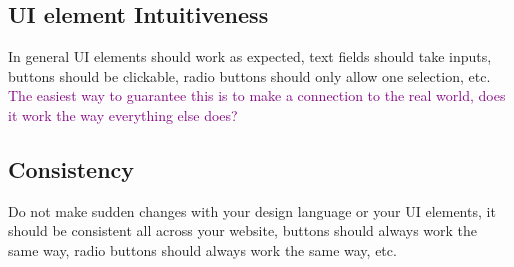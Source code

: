 \documentclass[main.tex,fontsize=6pt,paper=a4,paper=landscape,DIV=calc,]{scrartcl}
\begin{document}
\begin{multicols*}{4}
\subsection{UI element Intuitiveness}  
In general UI elements should work as expected, text fields should take inputs, buttons should be clickable, radio buttons should only allow one selection, etc.\newline
\textcolor{purple}{The easiest way to guarantee this is to make a connection to the real world, does it work the way everything else does?}

\subsection{Consistency}  
Do not make sudden changes with your design language or your UI elements, it should be consistent all across your website, buttons should always work the same way, radio buttons should always work the same way, etc.


\end{multicols*}
\end{document}
